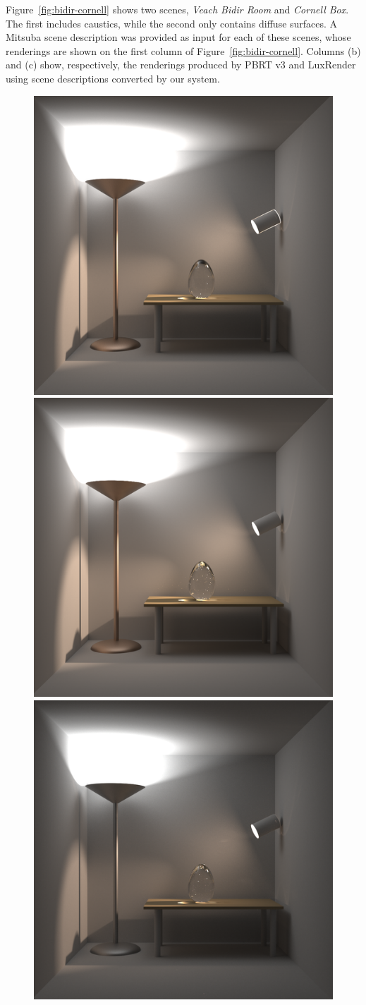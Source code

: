 Figure~\ref{fig:bidir-cornell} shows two scenes, \textit{Veach Bidir Room} and \textit{Cornell Box}. The first includes caustics, while the second only contains diffuse surfaces. A Mitsuba scene description was provided as input for each of these scenes, whose renderings are shown on the first column of Figure~\ref{fig:bidir-cornell}. Columns (b) and (c) show, respectively, the renderings produced by PBRT v3 and LuxRender using scene descriptions converted by our system.    

\begin{figure}[h]
  \centering
  \includegraphics[width=0.32\linewidth]{images/5_results/veach-bidir/1_from_mitsuba.png}
  \includegraphics[width=0.32\linewidth]{images/5_results/veach-bidir/2_to_pbrt.png}
  \includegraphics[width=0.32\linewidth]{images/5_results/veach-bidir/3_to_lux.png}

\end{figure}
